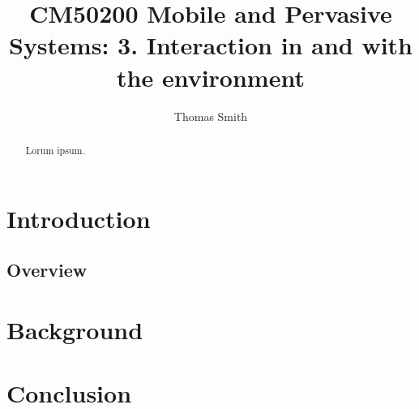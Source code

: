 \documentclass[oribibl]{llncs}
\begin{document}
\title{CM50200 Mobile and Pervasive Systems: 3. Interaction in and with the environment}


\author{Thomas Smith}
\maketitle

\begin{abstract}
Lorum ipsum.
\end{abstract}

\section{Introduction}


\subsection{Overview}


\section{Background}




\section{Conclusion}

\newpage


\end{document}
